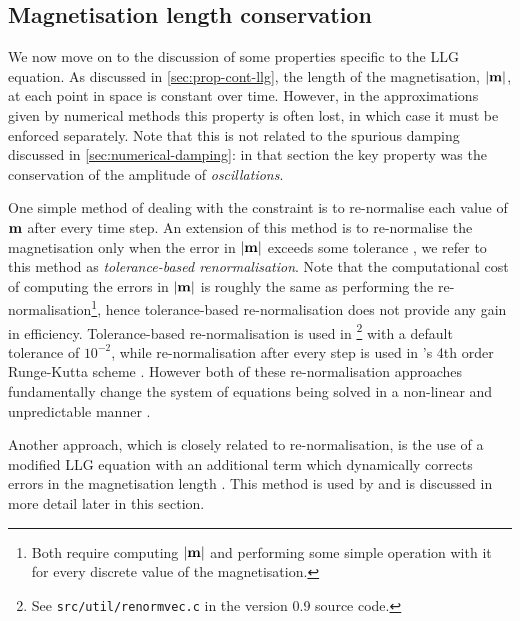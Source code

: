 \subsection{Magnetisation length conservation}
\label{sec:ensuring-constant-mv}

We now move on to the discussion of some properties specific to the LLG equation.
As discussed in \cref{sec:prop-cont-llg}, the length of the magnetisation, $\left|{\boldsymbol{\mathrm{m}}} \right|$, at each point in space is constant over time.
However, in the approximations given by numerical methods this property is often lost, in which case it must be enforced separately.
Note that this is not related to the spurious damping discussed in \cref{sec:numerical-damping}: in that section the key property was the conservation of the amplitude of \emph{oscillations}.

\label{alt-ml-renorm-intro} %
One simple method of dealing with the constraint is to re-normalise each value of $\boldsymbol{\mathrm{m}}$ after every time step.
An extension of this method is to re-normalise the magnetisation only when the error in $\left|{\boldsymbol{\mathrm{m}}} \right|$ exceeds some tolerance \cite{Fidler2000}, we refer to this method as \emph{tolerance-based renormalisation}.
Note that the computational cost of computing the errors in $\left|{\boldsymbol{\mathrm{m}}} \right|$ is roughly the same as performing the re-normalisation\footnote{Both require computing $\left|{\boldsymbol{\mathrm{m}}} \right|$ and performing some simple operation with it for every discrete value of the magnetisation.}, hence tolerance-based re-normalisation does not provide any gain in efficiency.
Tolerance-based re-normalisation is used in \magpar\footnote{See \texttt{src/util/renormvec.c} in the \magpar version 0.9 source code.} with a default tolerance of $10^{-2}$, while re-normalisation after every step is used in \oommf's 4th order Runge-Kutta scheme \cite{fangor-donahue-email}.
However both of these re-normalisation approaches fundamentally change the system of equations being solved in a non-linear and unpredictable manner \cite{Lewis2003}.

Another approach, which is closely related to re-normalisation, is the use of a modified LLG equation with an additional term which dynamically corrects errors in the magnetisation length \cite{Porter2005} \cite{Fischbacher2009}.
This method is used by \nmag \cite{Fischbacher2009} and is discussed in more detail later in this section.

